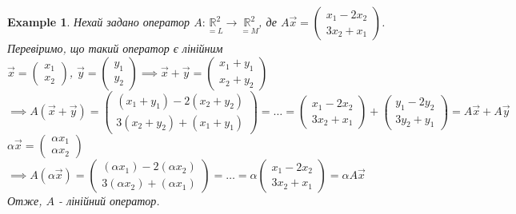\documentclass[a4paper, 10pt]{article}
\theoremstyle{theoremdd}
\newtheorem{example}[theorem]{Example}
\begin{document}
	\begin{example}
	Нехай задано оператор $A: \underset{=L}{\mathbb{R}^2} \to \underset{=M}{\mathbb{R}^2}$, де \hspace{0.3cm} $\displaystyle A\vec{x} = \begin{pmatrix} x_1 - 2x_2 \\ 3x_2 + x_1 \end{pmatrix}$.\\
	Перевіримо, що такий оператор є лінійним\\
	$\displaystyle \vec{x} = \begin{pmatrix} x_1 \\ x_2 \end{pmatrix}$, $\displaystyle \vec{y} = \begin{pmatrix} y_1 \\ y_2 \end{pmatrix} \implies \vec{x} + \vec{y} = \begin{pmatrix}
	x_1 + y_1 \\ x_2 + y_2
	\end{pmatrix}$\\
	$\implies A(\vec{x} + \vec{y}) = \begin{pmatrix} (x_1+y_1)-2(x_2+y_2) \\ 3(x_2+y_2)+(x_1+y_1) \end{pmatrix} = \dots = \begin{pmatrix} x_1 - 2x_2 \\ 3x_2 + x_1 \end{pmatrix} + \begin{pmatrix} y_1 - 2y_2 \\ 3y_2 + y_1 \end{pmatrix} = A\vec{x} + A\vec{y}$\\
	$\alpha \vec{x} = \begin{pmatrix} \alpha x_1 \\ \alpha x_2 \end{pmatrix}$\\
	$\implies A(\alpha \vec{x}) = \begin{pmatrix} (\alpha x_1) - 2(\alpha x_2) \\ 3(\alpha x_2) + (\alpha x_1) \end{pmatrix} = \dots = \alpha \begin{pmatrix} x_1 - 2x_2 \\ 3x_2 + x_1 \end{pmatrix} = \alpha A\vec{x}$\\
	Отже, $A$ - лінійний оператор.
	\end{example}
	
\end{document}
